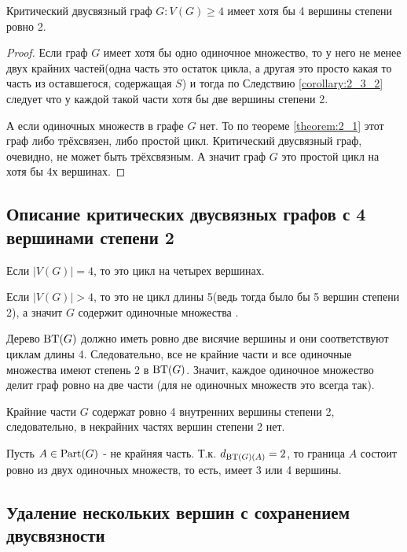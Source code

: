 \begin{crly} \label{corollary:2_4}
	Критический двусвязный граф $G : V(G) \geqslant 4$ имеет хотя бы 4 вершины степени ровно 2.
\end{crly}

\begin{proof}
	Если граф $G$ имеет хотя бы одно одиночное множество, то у него не менее двух крайних частей(одна часть это остаток цикла, а другая это просто какая то часть из оставшегося, содержащая $S$) и тогда по Следствию \ref{corollary:2_3_2} следует что у каждой такой части хотя бы две вершины степени 2.

	А если одиночных множеств в графе $G$ нет. То по теореме \ref{theorem:2_1} этот граф либо трёхсвязен, либо простой цикл.
	Критический двусвязный граф, очевидно, не может быть трёхсвязным.
	А значит граф  $G$ это простой цикл на хотя бы 4х вершинах.
\end{proof}

\subsection{Описание критических двусвязных графов с 4 вершинами степени 2}

Если $|V(G)| = 4$, то это цикл на четырех вершинах.

Если  $|V(G)| > 4$, то это не цикл длины 5(ведь тогда было бы 5 вершин степени 2), а значит  $G$ содержит одиночные множества .

Дерево $\operatorname{BT}(G)$ должно иметь ровно две висячие вершины и они соответствуют циклам длины 4.
Следовательно, все не крайние части и все одиночные множества имеют степень 2 в $\operatorname{BT}(G)$.
Значит, каждое одиночное множество делит граф ровно на две части (для не одиночных множеств это всегда так).

Крайние части $G$ содержат ровно 4 внутренних вершины степени 2, следовательно, в некрайних частях вершин степени 2 нет.

Пусть $A \in \operatorname{Part}(G)$ - не крайняя часть.
Т.к. $d_{\operatorname{BT}(G)(A)} = 2$, то граница  $A$ состоит ровно из двух одиночных множеств, то есть, имеет 3 или 4 вершины.


\subsection{Удаление нескольких вершин с сохранением двусвязности}

